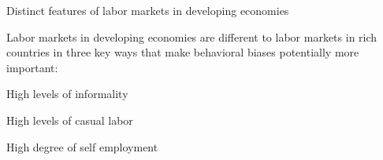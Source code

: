 \documentclass[aspectratio=169, 10pt, handout]{beamer}
\newenvironment{wideitemize}{\itemize\addtolength{\itemsep}{10pt}}{\enditemize}
\begin{document}
\begin{frame}{Distinct features of labor markets in developing economies}

\begin{wideitemize}

	\item Labor markets in developing economies are different to labor markets in rich countries in three key ways that make behavioral biases potentially more important:

	\begin{wideitemize}
	
	\bigskip
	
		\item High levels of informality
		
		\item High levels of casual labor

		\item High degree of self employment

	\end{wideitemize}
	
\end{wideitemize}

\end{frame}
\end{document}
